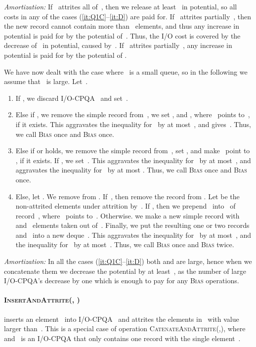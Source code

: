\documentclass[]{article}
\begin{document}
\noindent \textit{Amortization:} If~ attrites all of~, then we release
at least~ in potential, so all costs in any of the cases
(\ref{it:Q1C}--\ref{it:D}) are paid for. If~ attrites partially~, then
the new record cannot contain more than~ elements, and thus any increase in
potential is paid for by the potential of~. Thus, the I/O cost is covered
by the decrease of~ in potential, caused by~. If~ attrites
partially~, any increase in potential is paid for by the potential of
.

\noindent We have now dealt with the case where~ is a small queue, so in
the following we assume that~ is large. Let~.
\begin{enumerate}[1)]
  \item \label{it:Q1C} If , we discard
    I/O-CPQA~ and set~.

  \item \label{it:Q1lastC} Else if , we remove the
    simple record  from~, we set ,  and , where~ points
    to~, if it exists. This aggravates the inequality for~ by at
    most~, and gives~. Thus, we call
    \textsc{Bias} once and \textsc{Bias} once.

  \item \label{it:B} Else if  or  holds, we remove the simple record  from~, set , and make~ point to
    , if it exists. If , we set~. This aggravates the inequality for~ by at most~, and
    aggravates the inequality for~ by at most . Thus, we call
    \textsc{Bias} once and \textsc{Bias} once.

  \item \label{it:D} Else, let . We remove
     from . If~, then remove the
    record  from . Let  be the non-attrited
    elements under attrition by~. If ,
    then we prepend~ into~ of record~, where~
    points to~. Otherwise. we make a new simple record  with~
    and~ elements taken out of~. Finally, we put the
    resulting one or two records~ and~ into a new
    deque~.  This aggravates the inequality for~ by at
    most~, and the inequality for~ by at most~. Thus, we call
    \textsc{Bias} once and \textsc{Bias} twice.
\end{enumerate}
\noindent \textit{Amortization:} In all the cases (\ref{it:Q1C}--\ref{it:D})
both  and  are large, hence when we concatenate them we decrease the
potential by at least~, as the number of large I/O-CPQA's decrease by one
which is enough to pay for any \textsc{Bias} operations.

\paragraph{\textsc{InsertAndAttrite}(, )} inserts an element~ into
I/O-CPQA~ and attrites the elements in~ with value larger than~. This
is a special case of operation \textsc{CatenateAndAttrite}(,),
where~ and~ is an I/O-CPQA that only contains one record with the
single element~. 
\end{document}
